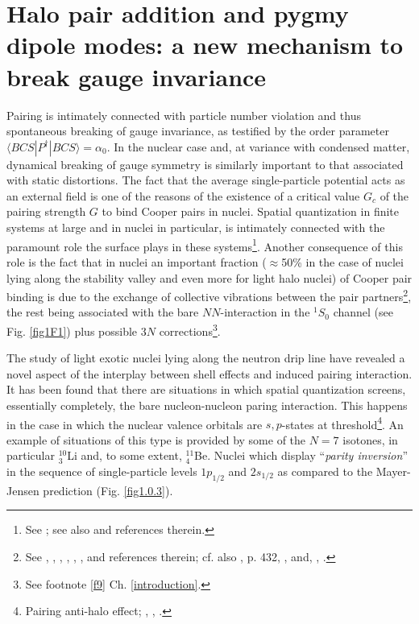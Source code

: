 \section[Halo pair addition mode and pygmy]{Halo pair addition and pygmy dipole modes: a new mechanism to break gauge invariance}\label{App1AF}
Pairing is intimately connected with particle number violation and thus spontaneous breaking of gauge invariance, as testified by the order parameter\\ \mbox{$\langle BCS|P^{\dagger}|BCS\rangle=\alpha_0$}.  In the nuclear case and, at variance with condensed matter, dynamical breaking of gauge symmetry is similarly important to that associated with static distortions. The fact that the average single-particle potential acts as an external field  is one of the reasons of the existence of a critical value $G_c$ of the pairing strength $G$ to bind Cooper pairs in nuclei. Spatial quantization in finite systems at large and in nuclei in particular, is intimately connected with the paramount role the surface plays in these systems\footnote{See \cite{Bohr:75}; see also \cite{Broglia:02d} and references therein.}. Another consequence of this role is  the fact that in nuclei an important fraction ($\approx$50\% in the case of nuclei lying along the stability valley and even more for light halo nuclei) of Cooper pair binding is due to the exchange of collective vibrations between the  pair partners\footnote{\label{f53C3} See \cite{Barranco:99}, \cite{Terasaki:02a}, \cite{Brink:05}, \cite{Saperstein:12}, \cite{Avdenkov:12}, \cite{Lombardo:12}, and references therein; cf. also \cite{Bohr:75}, p. 432, \cite{Barranco:01}, \cite{Potel:10} and, \cite{Pankratov:11}, \citet{Gori:04}.}, the rest being associated with the bare $NN$-interaction in the $^1S_0$ channel (see Fig. \ref{fig1F1}) plus possible $3N$ corrections\footnote{See footnote \ref{f9} Ch. \ref{introduction}.}. 


The study of light exotic nuclei lying along the neutron drip line have revealed a novel aspect of the interplay between shell effects and induced pairing interaction. It has been found  that there are situations in which spatial quantization screens, essentially completely, the bare nucleon-nucleon paring interaction. This happens in the case in which the nuclear valence orbitals are $s,p$-states at threshold\footnote{Pairing anti-halo effect; \cite{Bennaceur:00} 
, \cite{Hamamoto:03}, \cite{Hamamoto:04}.}. An example of situations of this type is provided by some of the $N=7$ isotones, in particular $^{10}_3$Li and, to some extent, $^{11}_4$Be. Nuclei which display ``\textit{parity inversion}'' in the sequence of single-particle levels $1p_{1/2}$ and $2s_{1/2}$ as compared to the Mayer-Jensen prediction (Fig. \ref{fig1.0.3}).


